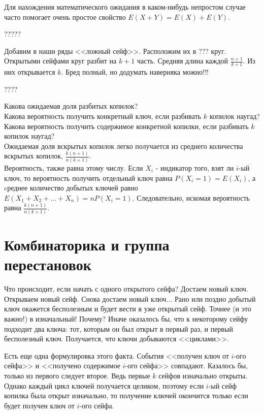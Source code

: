 \documentclass[pdftex,12pt,a4paper]{article}
\begin{document}
Для нахождения математического ожидания в каком-нибудь непростом случае часто помогает очень простое свойство $E(X+Y)=E(X)+E(Y)$. 

?????

Добавим в наши ряды <<ложный сейф>>. \label{lojniiseif} Расположим их в ??? круг. Открытыми сейфами круг разбит на $k+1$ часть. Средняя длина каждой $\frac{n+1}{k+1}$. Из них открывается $k$. Бред полный, но додумать наверняка можно!!!



????

Какова ожидаемая доля разбитых копилок? \\
Какова вероятность получить конкретный ключ, если разбивать $k$ копилок наугад? \\
Какова вероятность получить содержимое конкретной копилки, если разбивать $k$ копилок наугад? \\

Ожидаемая доля вскрытых копилок легко получается из среднего
количества вскрытых копилок, $\frac{k(n+1)}{n(k+1)}$. \\
Вероятность, также равна этому числу. Если $X_{i}$ - индикатор
того, взят ли $i$-ый ключ, то вероятность получить отдельный ключ
равна $P(X_{i}=1)=E(X_{i})$, а cреднее количество добытых ключей
равно $E(X_{1}+X_{2}+...+X_{n})=nP(X_{i}=1)$.
Следовательно, искомая вероятность равна $\frac{k(n+1)}{n(k+1)}$. \\





\section{Комбинаторика и группа перестановок}
Что происходит, если начать с одного открытого сейфа? Достаем новый ключ. Открываем новый сейф. Снова достаем новый ключ... Рано или поздно добытый ключ окажется бесполезным и будет вести в уже открытый сейф. Точнее (и это важно!) в изначальный! Почему? Иначе оказалось бы, что к некоторому сейфу подходит два ключа: тот, которым он был открыт в первый раз, и первый бесполезный ключ. Получается, что ключи добываются <<циклами>>.

Есть еще одна формулировка этого факта. События <<получен ключ от $i$-ого сейфа>> и <<получено содержимое $i$-ого сейфа>> совпадают. Казалось бы, только из первого следует второе. Ведь первые $k$ сейфов изначально открыты. Однако каждый цикл ключей получается
целиком, поэтому если $i$-ый сейф копилка была открыт изначально, то
получение ключей окончится только если будет получен ключ от
$i$-ого сейфа. \\
\end{document}
